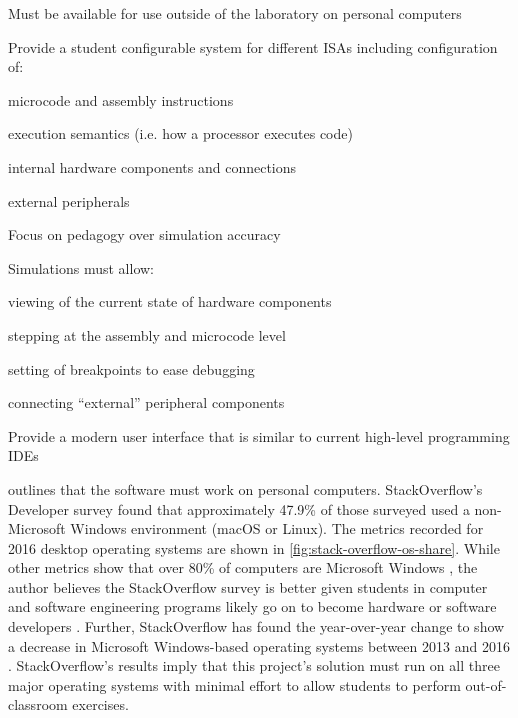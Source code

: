 \begin{requirements}
    \item\label{req:personal} Must be available for use outside of the laboratory on personal computers
        
    \item\label{req:configuration} Provide a student configurable system for different ISAs including configuration of:
        \begin{requirements}
            \item microcode and assembly instructions
            \item execution semantics (i.e. how a processor executes code)
            \item internal hardware components and connections
            \item external peripherals
        \end{requirements}
        
    \item\label{req:pedagogical} Focus on pedagogy over simulation accuracy
       
    \item\label{req:simulations} Simulations must allow: 
        \begin{requirements}
            \item viewing of the current state of hardware components
            \item stepping at the assembly and microcode level
            \item setting of breakpoints to ease debugging
            \item connecting ``external'' peripheral components
        \end{requirements}
    
    \item \label{req:modern} Provide a modern user interface that is similar to current high-level programming IDEs
        
\end{requirements}

 outlines that the software must work on personal computers. StackOverflow's Developer survey \cite{StackOverflowSurvey2016} found that approximately 47.9\% of those surveyed used a non-Microsoft Windows environment (macOS or Linux). The metrics recorded for 2016 desktop operating systems are shown in \cref{fig:stack-overflow-os-share}. While other metrics show that over 80\% of computers are Microsoft Windows \cite{StatCounter2017}, the author believes the StackOverflow survey is better given students in computer and software engineering programs likely go on to become hardware or software developers \cite[Sec.~II.~Developer~Profiles]{StackOverflowSurvey2016}. Further, StackOverflow has found the year-over-year change to show a decrease in Microsoft Windows-based operating systems between 2013 and 2016 \cite{StackOverflowSurvey2016}. StackOverflow's results imply that this project's solution must run on all three major operating systems with minimal effort to allow students to perform out-of-classroom exercises. 

